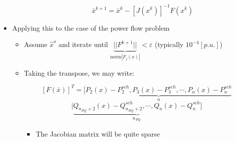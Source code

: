 \begin{itemize}
\begin{itemize}
\begin{itemize}
            $$\bar{x}^{k+1}=\bar{x}^{k}-[J(x^k)]^{-1}F(x^k)$$

        \end{itemize}

    \end{itemize}

  \item Applying this to the case of the power flow problem

    \begin{itemize}

      \item Assume $\hat{x}^o$ and iterate until $\underbrace{||F^{k+1}||}_{\text{norm}|F_j(x)|}< \varepsilon$ (typically $10^{-4}[p.u.]$)

      \item Taking the transpose, we may write:

        $$[F(\bar{x})]^T=\Big[ \underbrace{P_2(x)-P_2^{sch}, P_3(x)-P_3^{sch},\cdots,P_n(x)-P_n^{sch}}_{n}$$
        $$\Big| \underbrace{Q_{n_{PQ}+2}(x)-Q_{n_{PQ}+2}^{sch}, \cdots,Q_n(x)-Q_n^{sch} }_{n_{PQ}}\Big]$$

        \begin{itemize}

          \item The Jacobian matrix will be quite sparse

        \end{itemize}

    \end{itemize}

\end{itemize}



